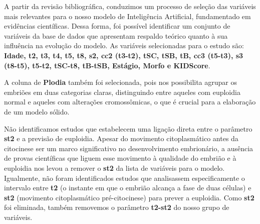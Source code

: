 
A partir da revisão bibliográfica, conduzimos um processo de seleção das variáveis mais relevantes para o nosso modelo de Inteligência Artificial, fundamentado em evidências científicas. Dessa forma, foi possível identificar um conjunto de variáveis da base de dados que apresentam respaldo teórico quanto à sua influência na evolução do modelo. As variáveis selecionadas para o estudo são: \textbf{Idade, t2, t3, t4, t5, t8, s2, cc2 (t3-t2), tSC, tSB, tB, cc3 (t5-t3), s3 (t8-t5), t5-t2, tSC-t8, tB-tSB, Estágio, Morfo e KIDScore}.

A coluna de \textbf{Plodia} também foi selecionada, pois nos possibilita agrupar os embriões em duas categorias claras, distinguindo entre aqueles com euploidia normal e aqueles com alterações cromossômicas, o que é crucial para a elaboração de um modelo sólido.

Não identificamos estudos que estabelecem uma ligação direta entre o parâmetro \textbf{st2} e a previsão de euploidia. Apesar do movimento citoplasmático antes da citocinese ser um marco significativo no desenvolvimento embrionário, a ausência de provas científicas que liguem esse movimento à qualidade do embrião e à euploidia nos levou a remover o \textbf{st2} da lista de variáveis para o modelo. Igualmente, não foram identificados estudos que analisassem especificamente o intervalo entre \textbf{t2} (o instante em que o embrião alcança a fase de duas células) e \textbf{st2} (movimento citoplasmático pré-citocinese) para prever a euploidia. Como \textbf{st2} foi eliminada, também removemos o parâmetro \textbf{t2-st2} do nosso grupo de variáveis.

